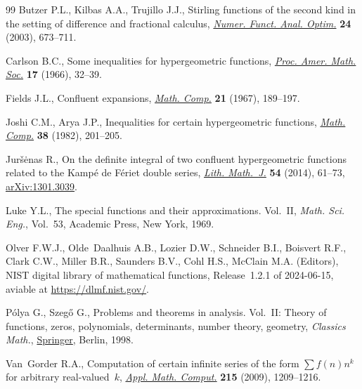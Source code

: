 \documentclass[11pt]{article}
\numberwithin{equation}{section}
\numberwithin{equation}{section}
\begin{document}
\begin{thebibliography}{99}
Butzer P.L., Kilbas A.A., Trujillo J.J., Stirling functions of the second kind
 in the setting of difference and fractional calculus, \href{https://doi.org/10.1081/NFA-120026366}{\textit{Numer. Funct.
 Anal. Optim.}} \textbf{24} (2003), 673--711.

Carlson B.C., Some inequalities for hypergeometric functions, \href{https://doi.org/10.2307/2035056}{\textit{Proc.
 Amer. Math. Soc.}} \textbf{17} (1966), 32--39.

Fields J.L., Confluent expansions, \href{https://doi.org/10.2307/2004159}{\textit{Math. Comp.}} \textbf{21} (1967),
 189--197.

Joshi C.M., Arya J.P., Inequalities for certain hypergeometric functions,
 \href{https://doi.org/10.2307/2007475}{\textit{Math. Comp.}} \textbf{38} (1982), 201--205.

Jur\v{s}\.enas R., On the definite integral of two confluent hypergeometric
 functions related to the {K}amp\'e de {F}\'eriet double series, \href{https://doi.org/10.1007/s10986-014-9227-y}{\textit{Lith.
 Math.~J.}} \textbf{54} (2014), 61--73, \href{https://arxiv.org/abs/1301.3039}{arXiv:1301.3039}.

Luke Y.L., The special functions and their approximations. {V}ol.~{II},
 \textit{Math. Sci. Eng.}, Vol.~53, Academic Press, New York, 1969.

Olver F.W.J., Olde~Daalhuis A.B., Lozier D.W., Schneider B.I., Boisvert R.F.,
 Clark C.W., Miller B.R., Saunders B.V., Cohl H.S., McClain M.A. (Editors),
 NIST digital library of mathematical functions, {R}elease~1.2.1 of
 2024-06-15, aviable at \url{https://dlmf.nist.gov/}.

P\'olya G., Szeg\H{o} G., Problems and theorems in analysis. {V}ol.~{II}:
 {T}heory of functions, zeros, polynomials, determinants, number theory,
 geometry, \textit{Classics Math.}, \href{https://doi.org/10.1007/978-3-642-61905-2}{Springer}, Berlin, 1998.

Van~Gorder R.A., Computation of certain infinite series of the form {$\sum
 f(n)n^k$} for arbitrary real-valued~{$k$}, \href{https://doi.org/10.1016/j.amc.2009.06.064}{\textit{Appl. Math. Comput.}}
 \textbf{215} (2009), 1209--1216.

\end{thebibliography}
\end{document}

